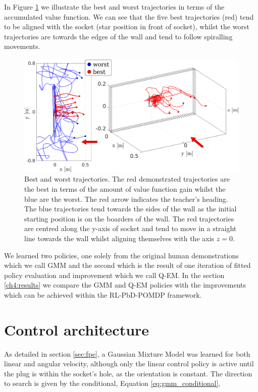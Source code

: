 In Figure \ref{fig:best_worst_traj} we illustrate the best and worst trajectories in terms of the accumulated value function.
We can see that the five best trajectories (red) tend to be aligned with the socket (star position in front of socket), 
whilst the worst trajectories are towards the edges of the wall and tend to follow spiralling movements. 

\begin{figure}
 \centering
 \includegraphics[width=\textwidth]{./ch4-PiH/Figures/ValueFunction/value_func_final_v3.pdf}
 \caption{Best and worst trajectories. The red demonstrated trajectories are the best in terms of the amount of value function 
 gain whilst the blue are the worst. The red arrow indicates the teacher's heading. The blue trajectories tend 
 towards the sides of the wall as the initial starting position is on the boarders of the wall. The red trajectories are centred along the y-axis of socket and tend to move in a straight line towards 
 the wall whilst aligning themselves with the axis $z=0$.} 
 \label{fig:best_worst_traj}
\end{figure}


We learned two policies, one solely from the original human demonstrations which we call GMM and the second which 
is the result of one iteration of fitted policy evaluation and improvement which we call Q-EM. In the section \ref{ch4:results}
we compare the GMM and Q-EM policies with the improvements which can be achieved within the RL-PbD-POMDP framework.

\section{Control architecture}\label{ch4:control_architecture}

As detailed in section \ref{sec:fpe}, a Gaussian Mixture Model was learned for both linear and angular velocity,
although only the linear control policy is active until the plug is within 
the socket's hole, as the orientation is constant.
The direction to search is given by the conditional, Equation \ref{eq:gmm_conditional},

